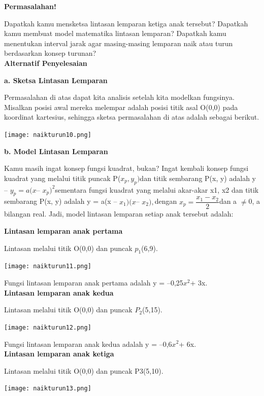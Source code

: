\documentclass[11pt,fleqn]{book} %
\begin{document}
\textbf{Permasalahan!}

Dapatkah kamu mensketsa lintasan lemparan ketiga anak tersebut? Dapatkah kamu membuat model matematika lintasan lemparan? Dapatkah kamu menentukan interval jarak agar masing-masing lemparan naik atau turun berdasarkan konsep turunan?\\


\textbf{Alternatif Penyelesaian}

\textbf{a. Sketsa Lintasan Lemparan}

Permasalahan di atas dapat kita analisis setelah kita modelkan fungsinya. Misalkan posisi awal mereka melempar adalah posisi titik asal O(0,0) pada koordinat kartesius, sehingga sketsa permasalahan di atas adalah sebagai berikut.

\begin{center}
\texttt{[image: naikturun10.png]}
\end{center}

\textbf{b. Model Lintasan Lemparan}

Kamu masih ingat konsep fungsi kuadrat, bukan? Ingat
kembali konsep fungsi kuadrat yang melalui titik puncak
P($x_{p}, y_{p}) $dan titik sembarang P(x, y) adalah y – $y_{p} = a(x
$– $x_{p})^2 $sementara fungsi kuadrat yang melalui akar-akar x1,
x2 dan titik sembarang P(x, y) adalah y = a(x – $x_{1})(x $– $x_{2}),
$dengan $x_{p}= \dfrac{x_{1}-x_{2}}{2}
$dan a $\neq $0, a bilangan real. Jadi, model
lintasan lemparan setiap anak tersebut adalah:

\textbf{Lintasan lemparan anak pertama}

Lintasan melalui titik O(0,0) dan puncak $p_{1}$(6,9).

\texttt{[image: naikturun11.png]}

Fungsi lintasan lemparan anak pertama adalah y = –0,25$x^{2} $+ 3x.\\

\textbf{Lintasan lemparan anak kedua}

Lintasan melalui titik O(0,0) dan puncak $P_{2}$(5,15).

\texttt{[image: naikturun12.png]}

Fungsi lintasan lemparan anak kedua adalah y = –0,6$x^{2} $+ 6x.\\

\textbf{Lintasan lemparan anak ketiga}

Lintasan melalui titik O(0,0) dan puncak P3(5,10).

\texttt{[image: naikturun13.png]}
\end{document}
